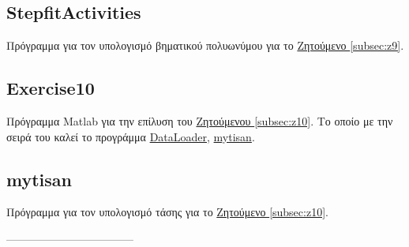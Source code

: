 \documentclass[11pt]{scrartcl} %
\begin{document}
	
	
\subsection{StepfitActivities}
\label{prog:StepfitActivities}
Πρόγραμμα για τον υπολογισμό βηματικού πολυωνύμου για το \hyperref[subsec:z9]{Ζητούμενο \ref*{subsec:z9}}.
		
	
	
	
	
\subsection{Exercise10}
\label{prog:10}
Πρόγραμμα Matlab για την επίλυση του \hyperref[subsec:z10]{Ζητούμενου \ref*{subsec:z10}}. Το οποίο με την σειρά του καλεί το προγράμμα \hyperref[prog:DataLoader]{DataLoader}, \hyperref[prog:mytisan]{mytisan}.


\subsection{mytisan}
\label{prog:mytisan}
Πρόγραμμα για τον υπολογισμό τάσης για το \hyperref[subsec:z10]{Ζητούμενο \ref*{subsec:z10}}.
		
	
	
	
	
	
	
	
	
	
	
	
-----------------------------------
\end{document}

